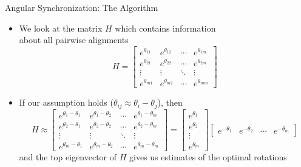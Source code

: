 \documentclass[10pt]{beamer}
\begin{document}
\begin{frame}{Angular Synchronization: The Algorithm}

\begin{itemize}
\item We look at the matrix $H$ which contains information \\about all pairwise alignments
$$H = \begin{bmatrix}
e^{\theta_{11}} & e^{\theta_{12}} & \cdots & e^{\theta_{1m}} \\
e^{\theta_{21}} & e^{\theta_{22}} & \cdots & e^{\theta_{2m}} \\
\vdots & \vdots & \ddots & \vdots \\
e^{\theta_{m1}} & e^{\theta_{m2}} & \cdots & e^{\theta_{mm}} 
\end{bmatrix} $$
\item If our assumption holds ($\theta_{ij} \approx \theta_i - \theta_j$), then 
$$ H \approx \begin{bmatrix}
e^{\theta_1-\theta_1} & e^{\theta_1-\theta_2} & \cdots & e^{\theta_1-\theta_m} \\
e^{\theta_2-\theta_1} & e^{\theta_2-\theta_2} & \cdots & e^{\theta_2-\theta_m} \\
\vdots & \vdots & \ddots & \vdots \\
e^{\theta_m-\theta_1} & e^{\theta_m-\theta_2} & \cdots & e^{\theta_m-\theta_m} 
\end{bmatrix} =
\begin{bmatrix}
e^{\theta_1} \\
e^{\theta_2} \\
\vdots \\
e^{\theta_m}
\end{bmatrix}
\begin{bmatrix}
e^{-\theta_1} & e^{-\theta_2} & \cdots & e^{-\theta_m}
\end{bmatrix} $$
and the top eigenvector of $H$ gives us estimates of the optimal rotations
\end{itemize}

\end{frame}
\end{document}
